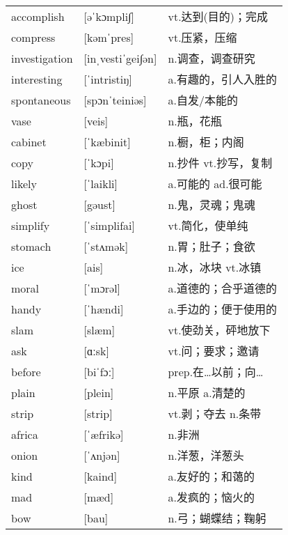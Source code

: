 \documentclass[a4paper]{article}
\begin{document}
\section{}
\begin{tabular}{l l l}

accomplish & [əˈkɔmpli∫] & vt.达到(目的)；完成 \\
compress & [kəmˈpres] & vt.压紧，压缩 \\
investigation & [inˌvestiˈgei∫ən] & n.调查，调查研究 \\
interesting & [ˈintristiŋ] & a.有趣的，引人入胜的 \\
spontaneous & [spɔnˈteiniəs] & a.自发/本能的 \\
vase & [veis] & n.瓶，花瓶 \\
cabinet & [ˈkæbinit] & n.橱，柜；内阁 \\
copy & [ˈkɔpi] & n.抄件 vt.抄写，复制 \\
likely & [ˈlaikli] & a.可能的 ad.很可能 \\
ghost & [gəust] & n.鬼，灵魂；鬼魂 \\
simplify & [ˈsimplifai] & vt.简化，使单纯 \\
stomach & [ˈstʌmək] & n.胃；肚子；食欲 \\
ice & [ais] & n.冰，冰块 vt.冰镇 \\
moral & [ˈmɔrəl] & a.道德的；合乎道德的 \\
handy & [ˈhændi] & a.手边的；便于使用的 \\
slam & [slæm] & vt.使劲关，砰地放下 \\
ask & [ɑːsk] & vt.问；要求；邀请 \\
before & [biˈfɔː] & prep.在…以前；向… \\
plain & [plein] & n.平原 a.清楚的 \\
strip & [strip] & vt.剥；夺去 n.条带 \\
africa & [ˈæfrikə] & n.非洲 \\
onion & [ˈʌnjən] & n.洋葱，洋葱头 \\
kind & [kaind] & a.友好的；和蔼的 \\
mad & [mæd] & a.发疯的；恼火的 \\
bow & [bau] & n.弓；蝴蝶结；鞠躬 \\

\end{tabular}
\end{document}
